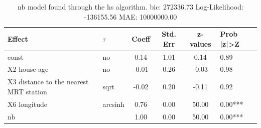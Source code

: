 \begin{table}
	\caption{nb model found through the hs algorithm. bic: 272336.73 Log-Likelihood: -136155.56 MAE: 10000000.00}
	\begin{center}
		\begin{tabular}{|l|l|c|c|c|l|}
			\hline
			Effect & $\tau$ & Coeff & Std. Err & z-values & Prob |z|>Z \\
			\hline
			const & no & 0.14 & 1.01 & 0.14 & 0.89 \\
			\hline
			X2 house age & no & -0.01 & 0.26 & -0.03 & 0.98 \\
			\hline
			X3 distance to the nearest MRT station & sqrt & -0.02 & 0.20 & -0.11 & 0.92 \\
			\hline
			X6 longitude & arcsinh & 0.76 & 0.00 & 50.00 & 0.00*** \\
			\hline
			nb &  & 1.00 & 0.00 & 50.00 & 0.00*** \\
			\hline
		\end{tabular}
	\end{center}
\end{table}